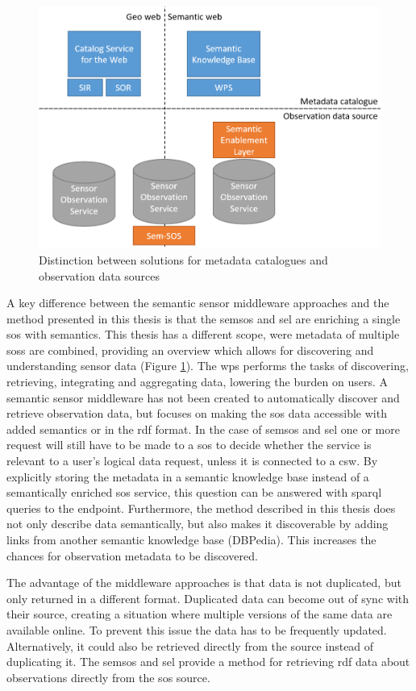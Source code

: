 \begin{figure}
	\centering
	\includegraphics[width=0.8\linewidth]{figs/catalogVSsource.PNG}
	\caption{Distinction between solutions for metadata catalogues and observation data sources}
	\label{fig:catVSsource}
\end{figure}

A key difference between the semantic sensor middleware approaches and the method presented in this thesis is that the \ac{semsos} and \ac{sel} are enriching a single \ac{sos} with semantics. This thesis has a different scope, were metadata of multiple \aclp{sos} are combined, providing an overview which allows for discovering and understanding sensor data (Figure \ref{fig:catVSsource}). The \ac{wps} performs the tasks of discovering, retrieving, integrating and aggregating data, lowering the burden on users. A semantic sensor middleware has not been created to automatically discover and retrieve observation data, but focuses on making the \ac{sos} data accessible with added semantics or in the \ac{rdf} format. In the case of \ac{semsos} and \ac{sel} one or more request will still have to be made to a \ac{sos} to decide whether the service is relevant to a user's logical data request, unless it is connected to a \ac{csw}. By explicitly storing the metadata in a semantic knowledge base instead of a semantically enriched \ac{sos} service, this question can be answered with \ac{sparql} queries to the endpoint. Furthermore, the method described in this thesis does not only describe data semantically, but also makes it discoverable by adding links from another semantic knowledge base (DBPedia). This increases the chances for observation metadata to be discovered.        

The advantage of the middleware approaches is that data is not duplicated, but only returned in a different format. Duplicated data can become out of sync with their source, creating a situation where multiple versions of the same data are available online. To prevent this issue the data has to be frequently updated. Alternatively, it could also be retrieved directly from the source instead of duplicating it. The \ac{semsos} and \ac{sel} provide a method for retrieving \ac{rdf} data about observations directly from the \ac{sos} source.


